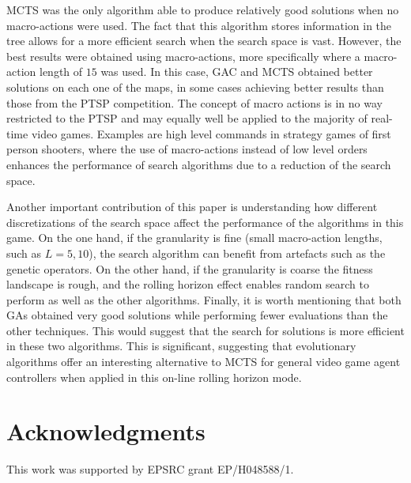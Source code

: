 \documentclass{sig-alternate}
\begin{document}
MCTS was the only algorithm able to produce relatively good solutions when no macro-actions were used. The fact that this algorithm stores information in the tree allows for a more efficient search when the search space is vast. However, the best results were obtained using macro-actions, more specifically where a macro-action length of $15$ was used. In this case, GAC and MCTS obtained better solutions on each one of the maps, in some cases achieving better results than those from the PTSP competition. The concept of macro actions is in no way restricted to the PTSP and may equally well be applied to the majority of real-time video games. Examples are high level commands in strategy games of first person shooters, where the use of macro-actions instead of low level orders enhances the performance of search algorithms due to a reduction of the search space.

Another important contribution of this paper is understanding how different discretizations of the search space affect the performance of the algorithms in this game. On the one hand, if the granularity is fine (small macro-action lengths, such as $L = 5, 10$), the search algorithm can benefit from artefacts such as the genetic operators. On the other hand, if the granularity is coarse the fitness landscape is rough, and the rolling horizon effect enables random search to perform as
well as the other algorithms. Finally, it is worth mentioning that both GAs obtained very good solutions while performing fewer evaluations than the other techniques. This would suggest that the search for solutions is more efficient in these two algorithms.  This is significant, suggesting that evolutionary algorithms offer an interesting alternative to MCTS for general video game agent controllers when applied in this on-line rolling horizon mode.

\section{Acknowledgments}
This work was supported by EPSRC grant EP/H048588/1. %


  
\end{document}
